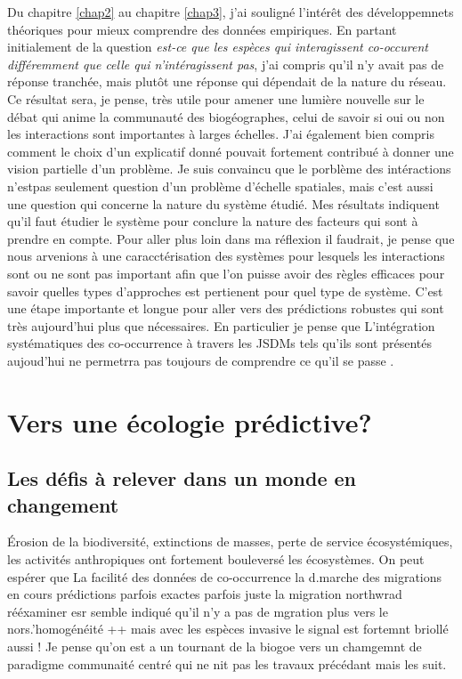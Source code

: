 Du chapitre \ref{chap2} au chapitre \ref{chap3}, j'ai souligné l'intérêt
des développemnets théoriques pour mieux comprendre des données
empiriques. En partant initialement de la question \emph{est-ce que les
espèces qui interagissent co-occurent différemment que celle qui
n'intéragissent pas}, j'ai compris qu'il n'y avait pas de réponse
tranchée, mais plutôt une réponse qui dépendait de la nature du réseau.
Ce résultat sera, je pense, très utile pour amener une lumière nouvelle
sur le débat qui anime la communauté des biogéographes, celui de savoir
si oui ou non les interactions sont importantes à larges échelles. J'ai
également bien compris comment le choix d'un explicatif donné pouvait
fortement contribué à donner une vision partielle d'un problème. Je suis
convaincu que le porblème des intéractions n'estpas seulement question
d'un problème d'échelle spatiales\citep{Araujo2014, Belmaker2015}, mais
c'est aussi une question qui concerne la nature du système étudié. Mes
résultats indiquent qu'il faut étudier le système pour conclure la
nature des facteurs qui sont à prendre en compte. Pour aller plus loin
dans ma réflexion il faudrait, je pense que nous arvenions à une
caracctérisation des systèmes pour lesquels les interactions sont ou ne
sont pas important afin que l'on puisse avoir des règles efficaces pour
savoir quelles types d'approches est pertienent pour quel type de
système. C'est une étape importante et longue pour aller vers des
prédictions robustes qui sont très aujourd'hui plus que nécessaires. En
particulier je pense que L'intégration systématiques des co-occurrence à
travers les JSDMs tels qu'ils sont présentés aujoud'hui ne permetrra pas
toujours de comprendre ce qu'il se passe
\citep{Ovaskainen2010, Pollock2014, Warton2015b}.

\section*{Vers une écologie
prédictive?}\label{vers-une-uxe9cologie-pruxe9dictive}

\subsection*{Les défis à relever dans un monde en
changement}\label{les-duxe9fis-uxe0-relever-dans-un-monde-en-changement}

Érosion de la biodiversité, extinctions de masses, perte de service
écosystémiques, les activités anthropiques ont fortement bouleversé les
écosystèmes. On peut espérer que La facilité des données de
co-occurrence la d.marche des migrations en cours prédictions parfois
exactes parfois juste la migration northwrad rééxaminer esr semble
indiqué qu'il n'y a pas de mgration plus vers le nors.'homogénéité ++
mais avec les espèces invasive le signal est fortemnt briollé aussi ! Je
pense qu'on est a un tournant de la biogoe vers un chamgemnt de
paradigme communaité centré qui ne nit pas les travaux précédant mais
les suit.

